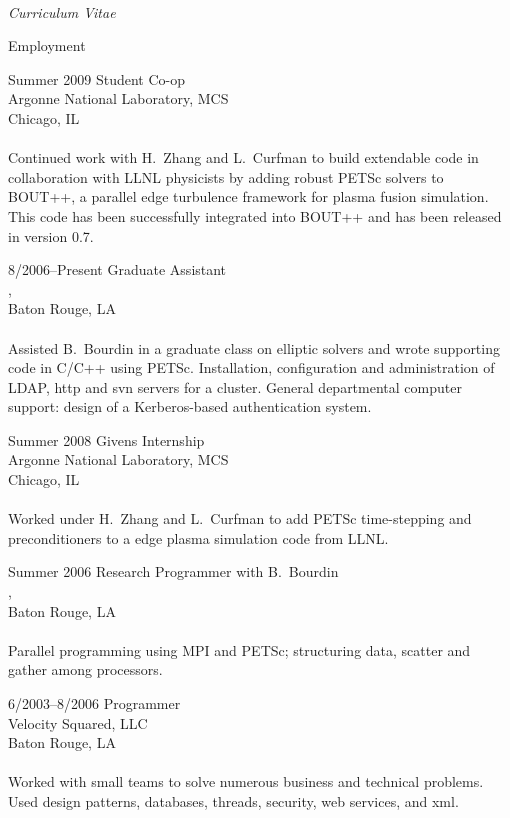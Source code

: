 \documentclass[10pt]{article}
\begin{document}
\begin{cv}{\name\\{\large \itshape Curriculum Vitae}}
\pagebreak

\begin{cvlist}{Employment}
	\item[Summer 2009] Student Co-op\\
	Argonne National Laboratory, MCS\\
	Chicago, IL\\
	\\	
	Continued work with H.~Zhang and L.~Curfman to build extendable code in collaboration
	with LLNL physicists by adding robust PETSc solvers to BOUT++, a parallel edge turbulence
	framework for plasma fusion simulation. This code has been successfully integrated
	into BOUT++ and has been released in version 0.7.	 
	
	\item[8/2006--Present] Graduate Assistant\\
	\institute, \dept\\
	Baton Rouge, LA\\
	\\
	Assisted B.~Bourdin in a graduate class on elliptic solvers and wrote 
	supporting code in C/C++ using PETSc. Installation, configuration and 
	administration of LDAP, http and svn servers for a cluster. General 
	departmental computer support: design of a Kerberos-based authentication system.
	
	\item[Summer 2008] Givens Internship\\
	Argonne National Laboratory, MCS\\
	Chicago, IL\\
	\\
	Worked under H.~Zhang and L.~Curfman to add PETSc time-stepping and 
	preconditioners to a edge plasma simulation code from LLNL.
	
	\item[Summer 2006] Research Programmer with B.~Bourdin\\
	\institute, \dept\\
	Baton Rouge, LA\\
	\\
	Parallel programming using MPI and PETSc; structuring data, scatter and gather among processors.
	
	\item[6/2003--8/2006] Programmer\\
	Velocity Squared, LLC\\
	Baton Rouge, LA\\
	\\
	Worked with small teams to solve numerous business and technical problems. Used design
	patterns, databases, threads, security, web services, and xml.
	

\end{cvlist}
\end{cv}
\end{document}
